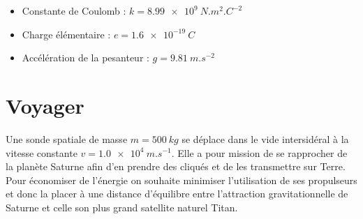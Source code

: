 \documentclass[a4paper,fontsize=14pt,fleqn]{scrartcl}%
\begin{document}
\begin{data}
    \begin{itemize}
        \item Constante de Coulomb : $k=\SI{8.99e9}{N.m^{2}.C^{-2}}$
        \item Charge élémentaire : $e=\SI{1.6e-19}{C}$
        \item Accélération de la pesanteur : $g=\SI{9.81}{m.s^{-2}}$
    \end{itemize}
\end{data}

\section{Voyager}
Une sonde spatiale de masse $m=\SI{500}{kg}$ se déplace dans le vide intersidéral à la vitesse constante $v=\SI{1.0e4}{m.s^{-1}}$. Elle a pour mission de se rapprocher de la planète Saturne afin d'en prendre des cliqués et de les transmettre sur Terre. Pour économiser de l'énergie on souhaite minimiser l'utilisation de ses propulseurs et donc la placer à une distance d'équilibre entre l'attraction gravitationnelle de Saturne et celle son plus grand satellite naturel Titan.\\
\end{document}
